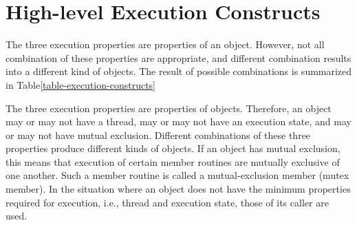 \section{High-level Execution Constructs}
The three execution properties are properties of an object. However, not all
combination of these properties are appropriate, and different combination
results into a different kind of objects. The result of possible combinations is
summarized in Table\ref{table-execution-constructs}

The three execution properties are properties of objects. Therefore, an object
may or may not have a thread, may
or may not have an execution state, and may or may not have mutual exclusion.
Different combinations of these three
properties produce different kinds of objects. If an object has mutual
exclusion, this means that execution of certain
member routines are mutually exclusive of one another. Such a member routine is
called a mutual-exclusion member
(mutex member). In the situation where an object does not have the minimum
properties required for execution, i.e.,
thread and execution state, those of its caller are used.

